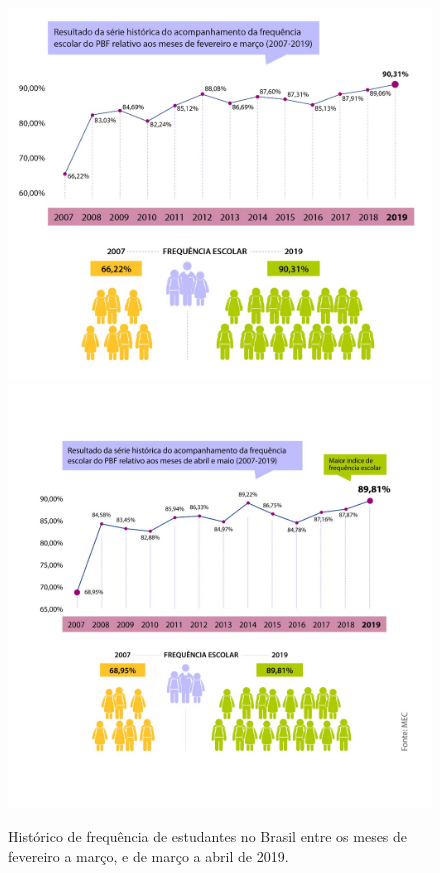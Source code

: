 \begin{figure}[ht!]
    \centering
    \includegraphics[width=0.46\linewidth]{Textuais/Imagens/image1.png}
    \includegraphics[width=0.46\linewidth]{Textuais/Imagens/image.png}
    \caption{Histórico de frequência de estudantes no Brasil entre os meses de fevereiro a março, e de março a abril de 2019.}
    \label{fig:my_label}
\end{figure}


